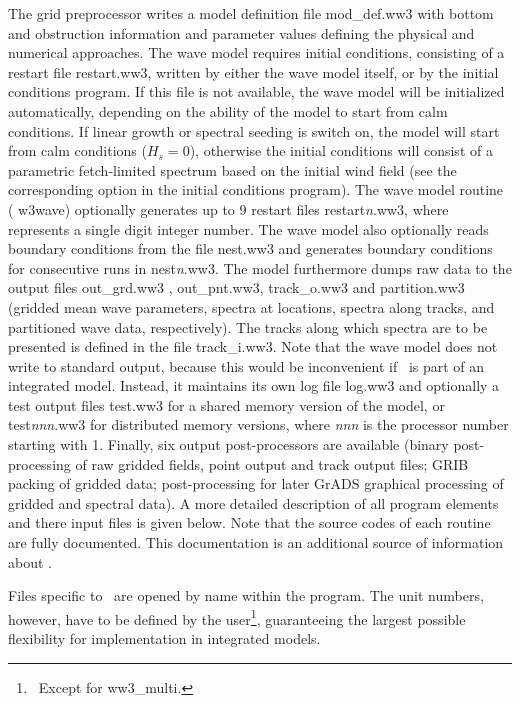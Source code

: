 The grid preprocessor writes a model definition file {\file mod\_def.ww3} with
bottom and obstruction information and parameter values defining the physical
and numerical approaches. The wave model requires initial conditions,
consisting of a restart file {\file restart.ww3}, written by either the wave
model itself, or by the initial conditions program. If this file is not
available, the wave model will be initialized automatically, depending on the
ability of the model to start from calm conditions. If linear growth or
spectral seeding is switch on, the model will start from calm conditions ($H_s
= 0$), otherwise the initial conditions will consist of a parametric
fetch-limited spectrum based on the initial wind field (see the corresponding
option in the initial conditions program).  The wave model routine ({\F
w3wave}) optionally generates up to 9 restart files {\file
restart{\em{n}}.ww3}, where {} represents a single digit integer
number. The wave model also optionally reads boundary conditions from the file
{\file nest.ww3} and generates boundary conditions for consecutive runs in
{\file nest{\em{n}}.ww3}. The model furthermore dumps raw data to the output
files {\file out\_grd.ww3 }, {\file out\_pnt.ww3}, {\file track\_o.ww3} and
{\file partition.ww3} (gridded mean wave parameters, spectra at locations,
spectra along tracks, and partitioned wave data, respectively). The tracks
along which spectra are to be presented is defined in the file {\file
track\_i.ww3}. Note that the wave model does not write to standard output,
because this would be inconvenient if \ws\ is part of an integrated
model. Instead, it maintains its own log file {\file log.ww3} and optionally a
test output files {\file test.ww3} for a shared memory version of the model,
or {\file test{\em{nnn}}.ww3} for distributed memory versions, where {\em nnn}
is the processor number starting with 1.  Finally, six output post-processors
are available (binary post-processing of raw gridded fields, point output and
track output files; GRIB packing of gridded data; post-processing for later
GrADS graphical processing of gridded and spectral data). A more detailed
description of all program elements and there input files is given below. Note
that the source codes of each routine are fully documented. This documentation
is an additional source of information about \ws.



Files specific to \ws\ are opened by name within the program. The unit
numbers, however, have to be defined by the user\footnote{~Except for {\file
ww3\_multi}.}, guaranteeing the largest possible flexibility for
implementation in integrated models.

